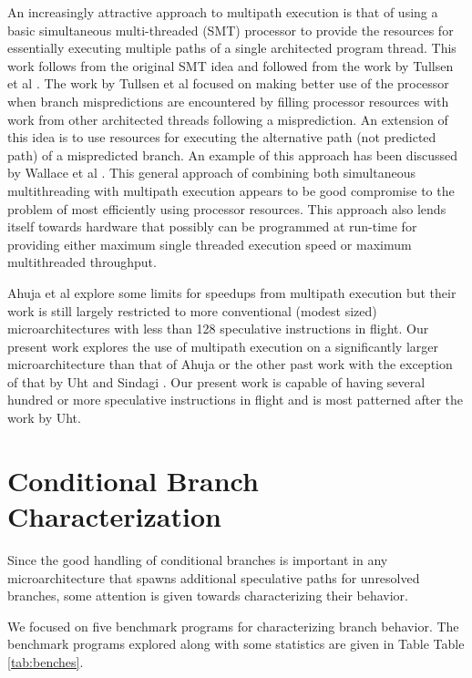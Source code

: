 \documentclass[10pt,dvips]{article}
\begin{document}
An increasingly attractive approach to multipath execution is that
of using a basic simultaneous multi-threaded (SMT) processor
to provide the resources for essentially executing multiple paths
of a single architected program thread.  This work follows from
the original SMT idea and followed from the work by
Tullsen et al \cite{Tullsen96}.  The work by Tullsen et al focused
on making better use of the processor when
branch mispredictions are encountered by filling processor resources with
work from other architected threads following a misprediction.
An extension of this idea is to use resources for executing
the alternative path (not predicted path) of a mispredicted branch.
An example of this approach has been discussed by 
Wallace et al \cite{Wallace98}.  This general approach of combining
both simultaneous multithreading with multipath execution appears
to be good compromise to the problem of most efficiently using
processor resources.  This approach also lends itself towards
hardware that possibly can be programmed at run-time for providing either
maximum single threaded execution speed or maximum multithreaded throughput.

Ahuja et al \cite{Ahuja98} explore some limits for speedups from
multipath execution but their work is still largely restricted to more
conventional (modest sized) microarchitectures with less than 128
speculative instructions in flight.  Our present work explores the use
of multipath execution on a significantly larger microarchitecture than
that of Ahuja or the other past work with the exception of that by
Uht and 
Sindagi \cite{Uht95}.
Our present work is capable of having several hundred or more
speculative instructions in flight and is most patterned after the
work by Uht.
%
\section{Conditional Branch Characterization}
%
Since the good handling of conditional branches is important
in any microarchitecture that spawns additional speculative
paths for unresolved branches, some attention is given
towards characterizing their behavior.  

We focused
on five benchmark programs for characterizing branch behavior.
The benchmark programs explored along with some statistics 
are given in Table
Table \ref{tab:benches}.
\end{document}
